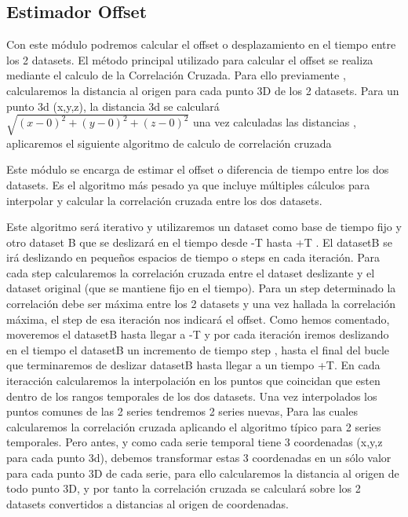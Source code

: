 \subsection{Estimador Offset}

	Con este módulo podremos calcular el offset o desplazamiento en el tiempo entre los 2 datasets.
	El método principal utilizado para calcular el offset se realiza mediante el calculo de la Correlación Cruzada.
	Para ello previamente , calcularemos la distancia al origen para cada punto 3D de los 2 datasets.
	Para un punto 3d (x,y,z), la distancia 3d se calculará 
	\begin{math}
	\sqrt{(x-0)^2 +(y-0)^2+(z-0)^2}
	\end{math}
	una vez calculadas las distancias , aplicaremos el siguiente algoritmo de calculo de correlación cruzada

Este módulo se encarga de estimar el offset o diferencia de tiempo entre los dos datasets. Es el algoritmo más pesado ya que incluye múltiples cálculos para interpolar y calcular 
la correlación cruzada entre los dos datasets.

Este algoritmo será iterativo y utilizaremos un dataset como base de tiempo fijo y otro dataset B que se deslizará en el tiempo desde -T hasta +T . El datasetB se irá 
deslizando en pequeños espacios de tiempo o steps en cada iteración. Para cada step calcularemos la correlación cruzada entre el dataset deslizante y el dataset original (que se 
mantiene fijo en el tiempo). Para un step determinado la correlación debe ser máxima entre los 2 datasets y una vez hallada la correlación máxima, el step de esa iteración nos 
indicará el offset. Como hemos comentado, moveremos el datasetB hasta llegar a -T y por cada iteración iremos deslizando en el tiempo el datasetB un incremento de tiempo step , hasta el final del bucle que terminaremos de deslizar datasetB hasta llegar a un tiempo +T. En cada iteracción calcularemos la interpolación en los puntos que coincidan que esten dentro de los rangos temporales de los dos datasets. Una vez interpolados los puntos comunes de las 2 series tendremos 2 series nuevas, Para las cuales calcularemos la correlación cruzada aplicando el algoritmo típico para 2 series temporales. Pero antes, y como cada serie temporal tiene 3 coordenadas (x,y,z para cada punto 3d), debemos transformar estas 3 coordenadas en un sólo valor para cada punto 3D de cada serie, para ello calcularemos la distancia al origen de todo punto 3D, y por tanto la correlación cruzada se calculará sobre los 2 datasets convertidos a distancias al origen de coordenadas.

